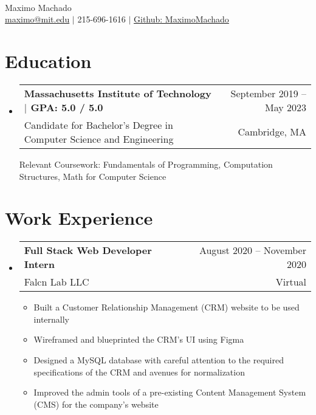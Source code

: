 \documentclass[letterpaper,12pt]{article} %
\makeatletter
\newcommand{\CVItem}[1]{
  \item\small{
    {#1 \vspace{-2pt}}
  }
}
\newcommand{\CVSubheading}[4]{
  \vspace{-2pt}\item
    \begin{tabular*}{0.97\textwidth}[t]{l@{\extracolsep{\fill}}r}
      \textbf{#1} & #2 \\
      \small#3 & \small #4 \\
    \end{tabular*}\vspace{-7pt}
}
\newcommand{\CVSubHeadingListStart}{\begin{itemize}[leftmargin=0.15in, label={}]} %
\newcommand{\CVSubHeadingListEnd}{\end{itemize}}
\newcommand{\CVItemListStart}{\begin{itemize}}
\newcommand{\CVItemListEnd}{\end{itemize}\vspace{-5pt}}
\makeatother
\begin{document}

\begin{minipage}[c]{0.05\textwidth}
  \-\
\end{minipage}

\begin{center}
  \Huge Maximo Machado \\ \vspace{1pt} %
  \small
  \href{mailto:maximo@mit.edu}{maximo@mit.edu} $|$
  215-696-1616 $|$
  \href{https://github.com/MaximoMachado}{Github: MaximoMachado}
\end{center}

\section{Education}
\CVSubHeadingListStart
\CVSubheading
{{Massachusetts Institute of Technology $|$ \small{GPA: 5.0 / 5.0}}}{September 2019 -- May 2023}
{Candidate for Bachelor's Degree in Computer Science and Engineering}{Cambridge, MA}

\small Relevant Coursework: Fundamentals of Programming, Computation Structures, Math for Computer Science
\CVSubHeadingListEnd
\vspace{-15pt}

\section{Work Experience}
\CVSubHeadingListStart
\CVSubheading
{Full Stack Web Developer Intern}{August 2020 -- November 2020}
{Falcn Lab LLC}{Virtual}
\CVItemListStart
\CVItem{Built a Customer Relationship Management (CRM) website to be used internally}
\CVItem{Wireframed and blueprinted the CRM's UI using Figma}
\CVItem{Designed a MySQL database with careful attention to the required specifications of the CRM and avenues for normalization}
\CVItem{Improved the admin tools of a pre-existing Content Management System (CMS) for the company's website}
\CVItemListEnd
\CVSubHeadingListEnd
\end{document}
